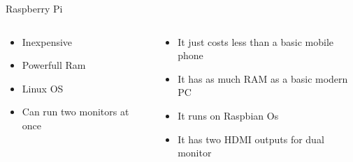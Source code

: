 \documentclass{beamer}
\begin{document}
\begin{frame}{Raspberry Pi}
	\begin{columns}
		\begin{column}{0.5\linewidth}
			\begin{itemize}
				\item<1->\alert<1>{Inexpensive} 
				\item<2->\alert<2>{Powerfull Ram} 
				\item<3->\alert<3>{ Linux OS}
				\item<4-> Can run two monitors at once
			\end{itemize}
		\end{column}
		\begin{column}{0.5\linewidth}
			\begin{itemize}
				\item<1>{It just costs less than a basic mobile phone}
				\item<2>{It has as much RAM as a basic modern PC}
				\item<3>{It runs on Raspbian Os}
				\item<4>{It has two HDMI outputs for dual monitor}
			\end{itemize}			
		\end{column}
	\end{columns}
\end{frame}
	
\end{document}
